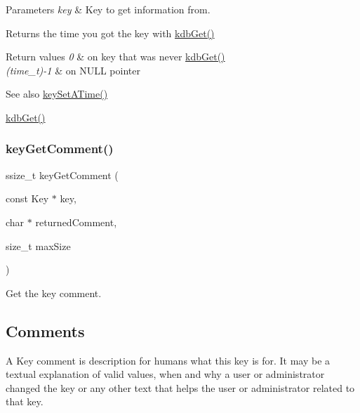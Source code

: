 \begin{DoxyParams}{Parameters}
{\em key} & Key to get information from. \\
\hline
\end{DoxyParams}
\begin{DoxyReturn}{Returns}
the time you got the key with \hyperlink{group__kdb_ga28e385fd9cb7ccfe0b2f1ed2f62453a1}{kdb\+Get()} 
\end{DoxyReturn}

\begin{DoxyRetVals}{Return values}
{\em 0} & on key that was never \hyperlink{group__kdb_ga28e385fd9cb7ccfe0b2f1ed2f62453a1}{kdb\+Get()} \\
\hline
{\em (time\+\_\+t)-\/1} & on N\+U\+LL pointer \\
\hline
\end{DoxyRetVals}
\begin{DoxySeeAlso}{See also}
\hyperlink{group__meta_ga995d8b84731673c88c7c01f3fed538b9}{key\+Set\+A\+Time()} 

\hyperlink{group__kdb_ga28e385fd9cb7ccfe0b2f1ed2f62453a1}{kdb\+Get()} 
\end{DoxySeeAlso}
\mbox{\label{group__meta_gafb89735689929ff717cc9f2d0d0b46a2}} 
\subsubsection{\texorpdfstring{key\+Get\+Comment()}{keyGetComment()}}
{\footnotesize\ttfamily ssize\+\_\+t key\+Get\+Comment (\begin{DoxyParamCaption}\item[{const Key $\ast$}]{key,  }\item[{char $\ast$}]{returned\+Comment,  }\item[{size\+\_\+t}]{max\+Size }\end{DoxyParamCaption})}



Get the key comment. 

\hypertarget{group__meta_comment}{}\subsection{Comments}\label{group__meta_comment}
A Key comment is description for humans what this key is for. It may be a textual explanation of valid values, when and why a user or administrator changed the key or any other text that helps the user or administrator related to that key.

